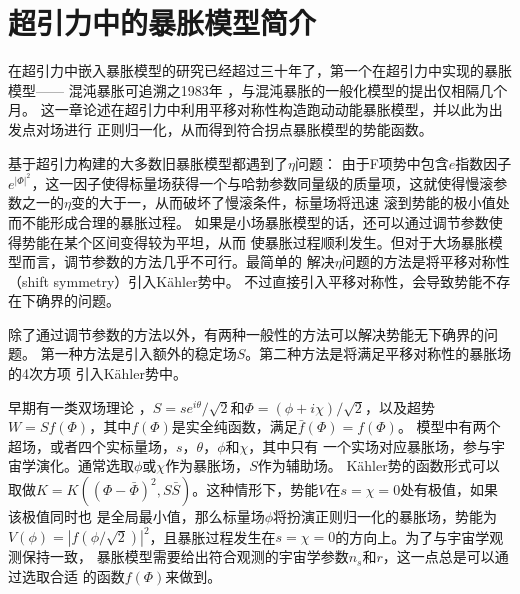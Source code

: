 \section{超引力中的暴胀模型简介}
在超引力中嵌入暴胀模型的研究已经超过三十年了，第一个在超引力中实现的暴胀模型——
混沌暴胀可追溯之1983年
\citep{goncharov1984chaotic}，与混沌暴胀的一般化模型的提出仅相隔几个月。 
这一章论述在超引力中利用平移对称性构造跑动动能暴胀模型，并以此为出发点对场进行
正则归一化，从而得到符合拐点暴胀模型的势能函数。

基于超引力构建的大多数旧暴胀模型\citep{freedman1989progress,deser1976consistent,wess1992supersymmetry}都遇到了$\eta$问题\citep{yamaguchi2011supergravity}：
由于F项势中包含$e$指数因子$e^{{\lvert
\Phi\rvert}^2}$，这一因子使得标量场获得一个与哈勃参数同量级的质量项，这就使得慢滚参数之一的$\eta$变的大于一，从而破坏了慢滚条件，标量场将迅速
滚到势能的极小值处而不能形成合理的暴胀过程。
如果是小场暴胀模型的话，还可以通过调节参数使得势能在某个区间变得较为平坦，从而
使暴胀过程顺利发生。但对于大场暴胀模型而言，调节参数的方法几乎不可行。最简单的
解决$\eta$问题的方法是将平移对称性（shift symmetry）引入K\"ahler势中\citep{kawasaki2000natural,kawasaki2001natural}。
不过直接引入平移对称性，会导致势能不存在下确界的问题\citep{kawasaki2000natural,kawasaki2001natural}。

除了通过调节参数的方法以外\citep{linde2015single,roest2015cosmological,goncharov1984chaotic}，有两种一般性的方法可以解决势能无下确界的问题。
第一种方法是引入额外的稳定场$S$\citep{kawasaki2000natural,kawasaki2001natural,kallosh2010new,kallosh2011general}。第二种方法是将满足平移对称性的暴胀场的4次方项
引入K\"ahler势中\citep{ketov2016single,ketov2014inflation,izawa2007supersymmetric,ketov2014generic}。

早期有一类双场理论
\citep{kallosh2010new}，$S=s
e^{i\theta}/\sqrt{2}$和$\Phi=(\phi+i\chi)/\sqrt{2}$，以及超势$W=Sf(\Phi)$，其中$f(\Phi)$是实全纯函数，满足$\bar{f}(\Phi)=f(\Phi)$。
模型中有两个超场，或者四个实标量场，$s$，$\theta$，$\phi$和$\chi$，其中只有
一个实场对应暴胀场，参与宇宙学演化。通常选取$\phi$或$\chi$作为暴胀场，$S$作为辅助场。
K\"ahler势的函数形式可以取做$K=K({(\Phi-\bar{\Phi})}^2,S\bar{S})$。这种情形下，势能$V$在$s=\chi=0$处有极值，如果该极值同时也
是全局最小值，那么标量场$\phi$将扮演正则归一化的暴胀场，势能为$V(\phi)=|f(\phi/\sqrt{2})|^2$，且暴胀过程发生在$s=\chi=0$的方向上。为了与宇宙学观测保持一致，
暴胀模型需要给出符合观测的宇宙学参数$n_{s}$和$r$，这一点总是可以通过选取合适
的函数$f(\Phi)$来做到。
